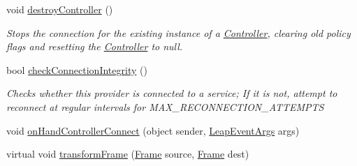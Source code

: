 \begin{DoxyCompactItemize}
void \mbox{\hyperlink{class_leap_1_1_unity_1_1_leap_service_provider_aaae9cfba0cd9335579e18dab63c508b0}{destroy\+Controller}} ()
\begin{DoxyCompactList}\small\item\em Stops the connection for the existing instance of a \mbox{\hyperlink{class_leap_1_1_controller}{Controller}}, clearing old policy flags and resetting the \mbox{\hyperlink{class_leap_1_1_controller}{Controller}} to null. \end{DoxyCompactList}\item 
bool \mbox{\hyperlink{class_leap_1_1_unity_1_1_leap_service_provider_af943038b16006eb527d6e2a0dccc84c9}{check\+Connection\+Integrity}} ()
\begin{DoxyCompactList}\small\item\em Checks whether this provider is connected to a service; If it is not, attempt to reconnect at regular intervals for M\+A\+X\+\_\+\+R\+E\+C\+O\+N\+N\+E\+C\+T\+I\+O\+N\+\_\+\+A\+T\+T\+E\+M\+P\+TS \end{DoxyCompactList}\item 
void \mbox{\hyperlink{class_leap_1_1_unity_1_1_leap_service_provider_aa5658f3913410c8e03b5cc954f8754e6}{on\+Hand\+Controller\+Connect}} (object sender, \mbox{\hyperlink{class_leap_1_1_leap_event_args}{Leap\+Event\+Args}} args)
\item 
virtual void \mbox{\hyperlink{class_leap_1_1_unity_1_1_leap_service_provider_a019689a8ce8bc22f6c0effa7010ec215}{transform\+Frame}} (\mbox{\hyperlink{class_leap_1_1_frame}{Frame}} source, \mbox{\hyperlink{class_leap_1_1_frame}{Frame}} dest)
\end{DoxyCompactItemize}
